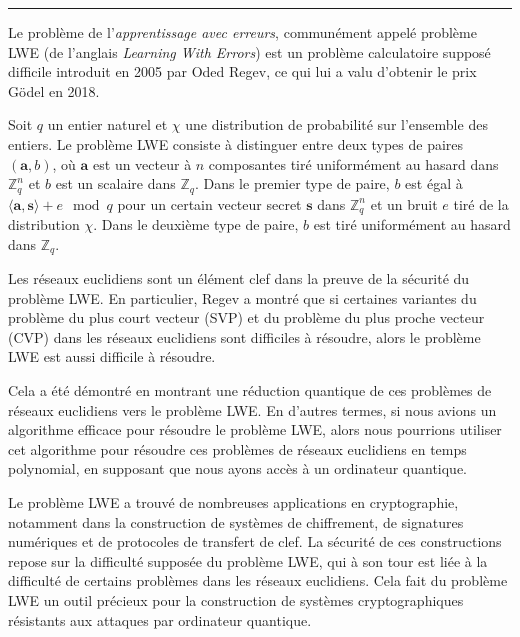 \vskip1cm
\hrule
\vskip1cm

Le problème de l’\emph{apprentissage avec erreurs}, communément appelé problème LWE (de l’anglais \emph{Learning With Errors}) est un problème calculatoire supposé difficile introduit en 2005 par Oded Regev\cite{STOC:Regev05}, ce qui lui a valu d’obtenir le prix Gödel en 2018.




Soit $q$ un entier naturel et $\chi$ une distribution de probabilité sur l'ensemble des entiers. Le problème LWE consiste à distinguer entre deux types de paires $(\mathbf{a}, b)$, où $\mathbf{a}$ est un vecteur à $n$ composantes tiré uniformément au hasard dans $\mathbb{Z}_q^n$ et $b$ est un scalaire dans $\mathbb{Z}_q$. Dans le premier type de paire, $b$ est égal à $\langle\mathbf{a},\mathbf{s}\rangle + e \mod q$ pour un certain vecteur secret $\mathbf{s}$ dans $\mathbb{Z}_q^n$ et un bruit $e$ tiré de la distribution $\chi$. Dans le deuxième type de paire, $b$ est tiré uniformément au hasard dans $\mathbb{Z}_q$.


Les réseaux euclidiens sont un élément clef dans la preuve de la sécurité du problème LWE. En particulier, Regev a montré que si certaines variantes du problème du plus court vecteur (SVP) et du problème du plus proche vecteur (CVP) dans les réseaux euclidiens sont difficiles à résoudre, alors le problème LWE est aussi difficile à résoudre.

Cela a été démontré en montrant une réduction quantique de ces problèmes de réseaux euclidiens vers le problème LWE. En d'autres termes, si nous avions un algorithme efficace pour résoudre le problème LWE, alors nous pourrions utiliser cet algorithme pour résoudre ces problèmes de réseaux euclidiens en temps polynomial, en supposant que nous ayons accès à un ordinateur quantique.


Le problème LWE a trouvé de nombreuses applications en cryptographie, notamment dans la construction de systèmes de chiffrement, de signatures numériques et de protocoles de transfert de clef. La sécurité de ces constructions repose sur la difficulté supposée du problème LWE, qui à son tour est liée à la difficulté de certains problèmes dans les réseaux euclidiens. Cela fait du problème LWE un outil précieux pour la construction de systèmes cryptographiques résistants aux attaques par ordinateur quantique.

